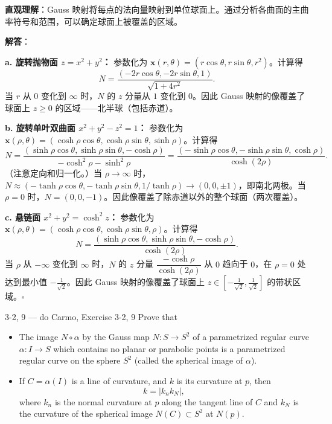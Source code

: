 \begin{solution}
\textbf{直观理解}：Gauss 映射将每点的法向量映射到单位球面上。通过分析各曲面的主曲率符号和范围，可以确定球面上被覆盖的区域。

\textbf{解答}：

\textbf{a. 旋转抛物面 $z = x^2 + y^2$：} 参数化为 $\mathbf{x}(r,\theta) = (r\cos\theta, r\sin\theta, r^2)$。计算得
\[
N = \frac{(-2r\cos\theta, -2r\sin\theta, 1)}{\sqrt{1+4r^2}}.
\]
当 $r$ 从 $0$ 变化到 $\infty$ 时，$N$ 的 $z$ 分量从 $1$ 变化到 $0$。因此 Gauss 映射的像覆盖了球面上 $z \geq 0$ 的区域——北半球（包括赤道）。

\textbf{b. 旋转单叶双曲面 $x^2 + y^2 - z^2 = 1$：} 参数化为 $\mathbf{x}(\rho,\theta) = (\cosh\rho\cos\theta, \cosh\rho\sin\theta, \sinh\rho)$。计算得
\[
N = \frac{(\sinh\rho\cos\theta, \sinh\rho\sin\theta, -\cosh\rho)}{-\cosh^2\rho - \sinh^2\rho} = \frac{(-\sinh\rho\cos\theta, -\sinh\rho\sin\theta, \cosh\rho)}{\cosh(2\rho)}.
\]
（注意定向和归一化。）当 $\rho \to \infty$ 时，$N \approx (-\tanh\rho\cos\theta, -\tanh\rho\sin\theta, 1/\tanh\rho) \to (0,0,\pm 1)$，即南北两极。当 $\rho = 0$ 时，$N = (0,0,-1)$。因此像覆盖了除赤道以外的整个球面（两次覆盖）。

\textbf{c. 悬链面 $x^2 + y^2 = \cosh^2 z$：} 参数化为 $\mathbf{x}(\rho,\theta) = (\cosh\rho\cos\theta, \cosh\rho\sin\theta, \rho)$。计算得
\[
N = \frac{(\sinh\rho\cos\theta, \sinh\rho\sin\theta, -\cosh\rho)}{\cosh(2\rho)}.
\]
当 $\rho$ 从 $-\infty$ 变化到 $\infty$ 时，$N$ 的 $z$ 分量 $\dfrac{-\cosh\rho}{\cosh(2\rho)}$ 从 $0$ 趋向于 $0$，在 $\rho = 0$ 处达到最小值 $-\frac{1}{\sqrt{2}}$。因此 Gauss 映射的像覆盖了球面上 $z \in [-\frac{1}{\sqrt{2}}, \frac{1}{\sqrt{2}}]$ 的带状区域。$\square$
\end{solution}

\begin{exercise}{3-2, 9 — do Carmo, Exercise 3-2, 9}
Prove that
\begin{itemize}
\item[a.] The image $N \circ \alpha$ by the Gauss map $N \colon S \to S^2$ of a parametrized regular curve $\alpha \colon I \to S$ which contains no planar or parabolic points is a parametrized regular curve on the sphere $S^2$ (called the spherical image of $\alpha$).
\item[b.] If $C = \alpha(I)$ is a line of curvature, and $k$ is its curvature at $p$, then
\[
k = | k _ {n} k _ {N} |,
\]
where $k_{n}$ is the normal curvature at $p$ along the tangent line of $C$ and $k_{N}$ is the curvature of the spherical image $N(C) \subset S^2$ at $N(p)$.
\end{itemize}
\end{exercise}

